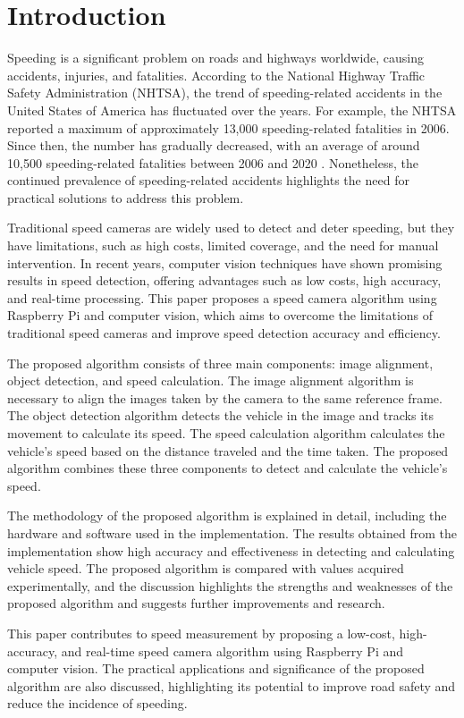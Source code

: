 \chapter{Introduction}
Speeding is a significant problem on roads and highways worldwide, causing accidents, injuries, and fatalities. According to the National Highway Traffic Safety Administration (NHTSA), the trend of speeding-related accidents in the United States of America has fluctuated over the years. For example, the NHTSA reported a maximum of approximately 13,000 speeding-related fatalities in 2006. Since then, the number has gradually decreased, with an average of around 10,500 speeding-related fatalities between 2006 and 2020 \cite{carlier22}. Nonetheless, the continued prevalence of speeding-related accidents highlights the need for practical solutions to address this problem.

Traditional speed cameras are widely used to detect and deter speeding, but they have limitations, such as high costs, limited coverage, and the need for manual intervention. In recent years, computer vision techniques have shown promising results in speed detection, offering advantages such as low costs, high accuracy, and real-time processing. This paper proposes a speed camera algorithm using Raspberry Pi and computer vision, which aims to overcome the limitations of traditional speed cameras and improve speed detection accuracy and efficiency.

The proposed algorithm consists of three main components: image alignment, object detection, and speed calculation. The image alignment algorithm is necessary to align the images taken by the camera to the same reference frame. The object detection algorithm detects the vehicle in the image and tracks its movement to calculate its speed. The speed calculation algorithm calculates the vehicle's speed based on the distance traveled and the time taken. The proposed algorithm combines these three components to detect and calculate the vehicle's speed.

The methodology of the proposed algorithm is explained in detail, including the hardware and software used in the implementation. The results obtained from the implementation show high accuracy and effectiveness in detecting and calculating vehicle speed. The proposed algorithm is compared with values acquired experimentally, and the discussion highlights the strengths and weaknesses of the proposed algorithm and suggests further improvements and research.

This paper contributes to speed measurement by proposing a low-cost, high-accuracy, and real-time speed camera algorithm using Raspberry Pi and computer vision. The practical applications and significance of the proposed algorithm are also discussed, highlighting its potential to improve road safety and reduce the incidence of speeding.